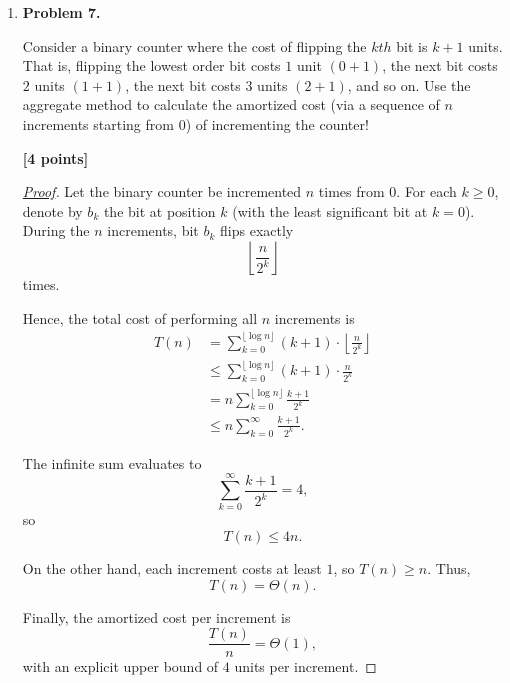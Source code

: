 \documentclass[11pt]{article}
\begin{document}
\begin{enumerate}
\begin{enumerate}
\begin{proof}[\underline{Proof}]
and $n^2$ is \textbf{not} $O(n)$. So the claimed relation can fail.


\end{proof}

\end{enumerate}

\item \textbf{Problem 7.}

Consider a binary counter where the cost of flipping the \(kth\) bit is \(k + 1\) units. That is, flipping the lowest order bit costs \(1\) unit \((0+1)\), the next bit costs \(2\) units \((1+1)\), the next bit costs \(3\) units \((2+1)\), and so on. Use the aggregate method to calculate the amortized cost (via a sequence of \(n\) increments starting from \(0\)) of incrementing the counter!

\begin{flushright}
\textbf{[4 points]}
\end{flushright}

\begin{proof}[\underline{Proof}]

Let the binary counter be incremented \(n\) times from \(0\).  
For each \(k \geq 0\), denote by \(b_k\) the bit at position \(k\) (with the least significant bit at \(k=0\)).  
During the \(n\) increments, bit \(b_k\) flips exactly
\[
\left\lfloor \frac{n}{2^k} \right\rfloor
\]
times.

Hence, the total cost of performing all \(n\) increments is
\[
\begin{aligned}
T(n) &= \sum_{k=0}^{\lfloor \log n \rfloor} (k+1) \cdot \left\lfloor \tfrac{n}{2^k} \right\rfloor \\
&\leq \sum_{k=0}^{\lfloor \log n \rfloor} (k+1) \cdot \frac{n}{2^k} \\
&= n \sum_{k=0}^{\lfloor \log n \rfloor} \frac{k+1}{2^k} \\
&\leq n \sum_{k=0}^{\infty} \frac{k+1}{2^k}.
\end{aligned}
\]

The infinite sum evaluates to
\[
\sum_{k=0}^{\infty} \frac{k+1}{2^k} = 4,
\]
so
\[
T(n) \leq 4n.
\]

On the other hand, each increment costs at least \(1\), so \(T(n) \geq n\).  
Thus,
\[
T(n) = \Theta(n).
\]

Finally, the amortized cost per increment is
\[
\frac{T(n)}{n} = \Theta(1),
\]
with an explicit upper bound of \(4\) units per increment.
\end{proof}

\newpage


\end{enumerate}
\end{document}
